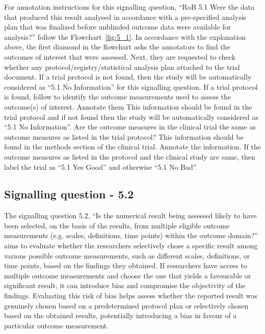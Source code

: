 \documentclass[sn-mathphys,Numbered]{sn-jnl}%
\begin{document}
For annotation instructions for this signalling question, ``RoB 5.1 Were the data that produced this result analysed in accordance with a pre-specified analysis plan that was finalized before unblinded outcome data were available for analysis?'' follow the Flowchart~\ref{fig:5_1}.
In accordance with the explanation above, the first diamond in the flowchart asks the annotators to find the outcomes of interest that were assessed. 
Next, they are requested to check whether any protocol/registry/statistical analysis plan attached to the trial document.
If a trial protocol is not found, then the study will be automatically considered as ``5.1 No Information'' for this signalling question.
If a trial protocol is found, follow to identify the outcome measurements used to assess the outcome(s) of interest.
Annotate them
This information should be found in the trial protocol and if not found then the study will be automatically considered as ``5.1 No Information''.
Are the outcome measures in the clinical trial the same as outcome measures as listed in the trial protocol?
This information should be found in the methods section of the clinical trial.
Annotate the information. 
If the outcome measures as listed in the protocol and the clinical study are same, then label the trial as ``5.1 Yes Good'' and otherwise ``5.1 No Bad''.



%
%
%
\subsection*{Signalling question - 5.2 }
\label{subsec:5_2}
%
The signalling question 5.2, ``Is the numerical result being assessed likely to have been selected, on the basis of the results, from multiple eligible outcome measurements (e.g. scales, definitions, time points) within the outcome domain?'' aims to evaluate whether the researchers selectively chose a specific result among various possible outcome measurements, such as different scales, definitions, or time points, based on the findings they obtained.
If researchers have access to multiple outcome measurements and choose the one that yields a favourable or significant result, it can introduce bias and compromise the objectivity of the findings. 
Evaluating this risk of bias helps assess whether the reported result was genuinely chosen based on a predetermined protocol plan or selectively chosen based on the obtained results, potentially introducing a bias in favour of a particular outcome measurement.
\end{document}
